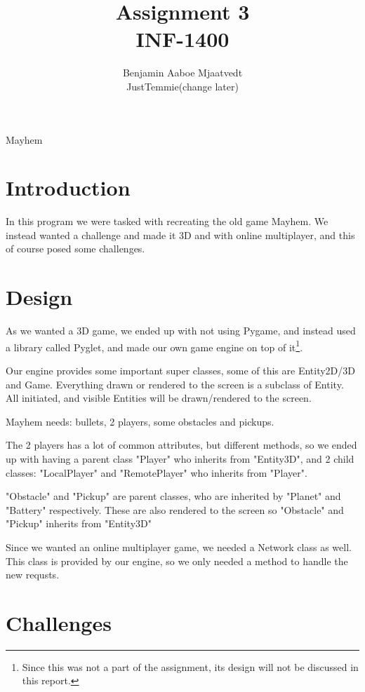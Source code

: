 \documentclass[journal]{IEEEtran}
\begin{document}
\title{Assignment 3\\ INF-1400}

\author{Benjamin Aaboe Mjaatvedt\\ JustTemmie(change later)}
%
{Mayhem}


\maketitle

\section{Introduction} \label{Section:Introduction}
In this program we were tasked with recreating the old game Mayhem. We instead wanted a challenge and made it 3D and with online multiplayer, and this of course posed some challenges.
\section{Design}\label{Section:Design}
As we wanted a 3D game, we ended up with not using Pygame, and instead used a library called Pyglet, and made our own game engine on top of it\footnote{Since this was not a part of the assignment, its design will not be discussed in this report.}.

Our engine provides some important super classes, some of this are Entity2D/3D and Game. Everything drawn or rendered to the screen is a subclass of Entity. All initiated, and visible Entities will be drawn/rendered to the screen. 

Mayhem needs: bullets, 2 players, some obstacles and pickups.

The 2 players has a lot of common attributes, but different methods, so we ended up with having a parent class "Player" who inherits from "Entity3D", and 2 child classes: "LocalPlayer" and "RemotePlayer" who inherits from "Player".

"Obstacle" and "Pickup" are parent classes, who are inherited by "Planet" and "Battery" respectively. These are also rendered to the screen so "Obstacle" and "Pickup" inherits from "Entity3D"

Since we wanted an online multiplayer game, we needed a Network class as well. This class is provided by our engine, so we only needed a method to handle the new requsts.
\section{Challenges}\label{Section:Challenges}
\end{document}
